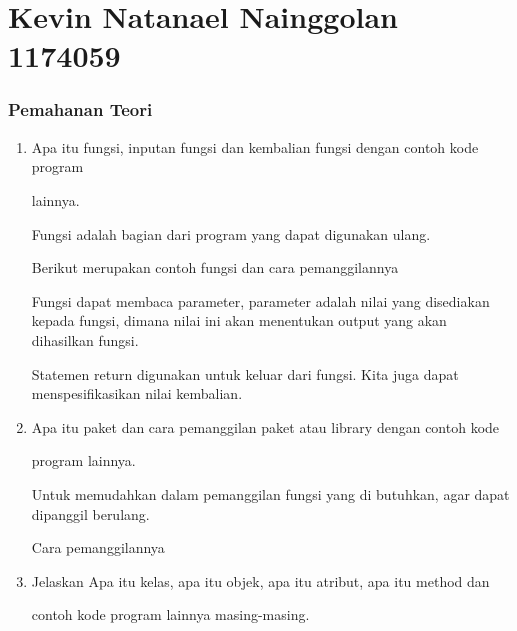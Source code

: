 \section {Kevin Natanael Nainggolan 1174059}
\subsubsection{Pemahanan Teori}

\begin{enumerate}

    \item Apa itu fungsi, inputan 
fungsi dan kembalian fungsi dengan contoh kode program

    lainnya.

    Fungsi adalah bagian dari program yang dapat digunakan ulang.

    Berikut merupakan contoh fungsi dan cara pemanggilannya

    



    Fungsi dapat membaca parameter, parameter adalah nilai yang disediakan kepada fungsi, dimana nilai ini akan menentukan output yang akan dihasilkan fungsi.

    



    Statemen return digunakan untuk keluar dari fungsi. Kita juga dapat menspesifikasikan nilai kembalian.

    



    \item Apa itu paket dan cara pemanggilan paket atau library dengan contoh kode

    program lainnya.

    Untuk memudahkan dalam pemanggilan fungsi yang di butuhkan, agar dapat dipanggil berulang.

    Cara pemanggilannya

    



    \item Jelaskan Apa itu kelas, apa itu objek, apa itu atribut, apa itu method dan

    contoh kode program lainnya masing-masing.


\end{enumerate}
